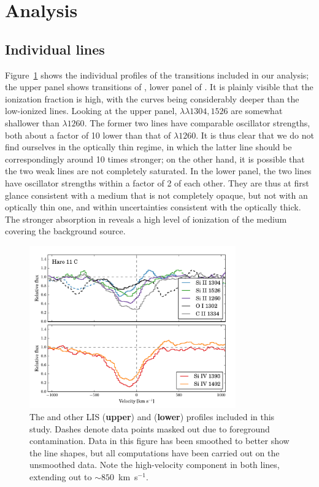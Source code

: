 \documentclass[twocolumn,]{aastex61}
\begin{document}
\section{Analysis}\label{analysis}

\subsection{Individual lines}\label{individual-lines}

Figure~\ref{fig:SingleLines} shows the individual profiles of the
transitions included in our analysis; the upper panel shows transitions
of , lower panel of . It is plainly visible that
the ionization fraction is high, with the  curves being
considerably deeper than the low-ionized lines. Looking at the upper
panel,  $\lambda \lambda 1304, 1526$ are somewhat shallower
than  $\lambda 1260$. The former two lines have comparable
oscillator strengths, both about a factor of 10 lower than that of
$\lambda 1260$. It is thus clear that we do not find ourselves in the
optically thin regime, in which the latter line should be
correspondingly around 10 times stronger; on the other hand, it is
possible that the two weak lines are not completely saturated. In the
lower panel, the two  lines have oscillator strengths within
a factor of 2 of each other. They are thus at first glance consistent
with a medium that is not completely opaque, but not with an optically
thin one, and within uncertainties consistent with the optically thick.
The stronger absorption in  reveals a high level of
ionization of the medium covering the background source.

\begin{figure}
\centering
\includegraphics[width=3.500in]{../Figs/HISLISProfiles.pdf}
\caption{The  and other LIS (\textbf{upper}) and 
(\textbf{lower}) profiles included in this study. Dashes denote data
points masked out due to foreground contamination. Data in this figure has
been smoothed to better show the line shapes, but all computations have been
carried out on the unsmoothed data. Note the
high-velocity component in both  lines, extending out to
$\sim 850$~km~s$^{-1}$.}\label{fig:SingleLines}
\end{figure}
\end{document}
